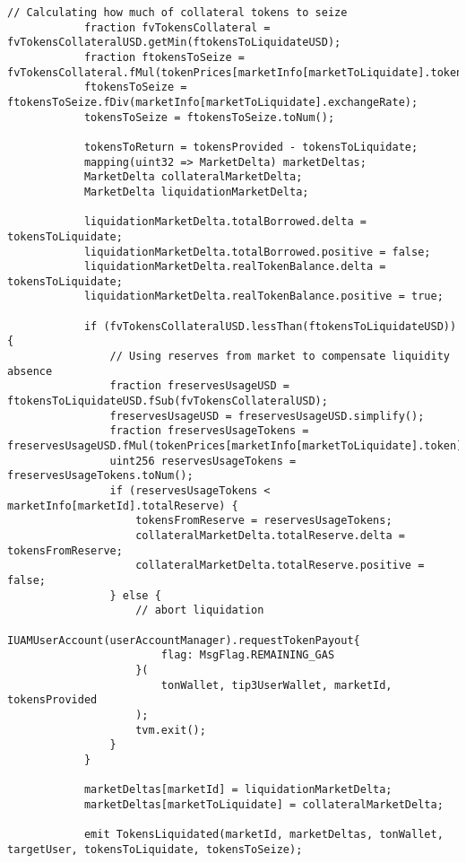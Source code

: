 \begin{lstlisting}[firstnumber=101]
            // Calculating how much of collateral tokens to seize
            fraction fvTokensCollateral = fvTokensCollateralUSD.getMin(ftokensToLiquidateUSD);
            fraction ftokensToSeize = fvTokensCollateral.fMul(tokenPrices[marketInfo[marketToLiquidate].token]);
            ftokensToSeize = ftokensToSeize.fDiv(marketInfo[marketToLiquidate].exchangeRate);
            tokensToSeize = ftokensToSeize.toNum();

            tokensToReturn = tokensProvided - tokensToLiquidate;
            mapping(uint32 => MarketDelta) marketDeltas;
            MarketDelta collateralMarketDelta;
            MarketDelta liquidationMarketDelta;

            liquidationMarketDelta.totalBorrowed.delta = tokensToLiquidate;
            liquidationMarketDelta.totalBorrowed.positive = false;
            liquidationMarketDelta.realTokenBalance.delta = tokensToLiquidate;
            liquidationMarketDelta.realTokenBalance.positive = true;

            if (fvTokensCollateralUSD.lessThan(ftokensToLiquidateUSD)) {
                // Using reserves from market to compensate liquidity absence
                fraction freservesUsageUSD = ftokensToLiquidateUSD.fSub(fvTokensCollateralUSD);
                freservesUsageUSD = freservesUsageUSD.simplify();
                fraction freservesUsageTokens = freservesUsageUSD.fMul(tokenPrices[marketInfo[marketToLiquidate].token]);
                uint256 reservesUsageTokens = freservesUsageTokens.toNum();
                if (reservesUsageTokens < marketInfo[marketId].totalReserve) {
                    tokensFromReserve = reservesUsageTokens;
                    collateralMarketDelta.totalReserve.delta = tokensFromReserve;
                    collateralMarketDelta.totalReserve.positive = false;
                } else {
                    // abort liquidation
                    IUAMUserAccount(userAccountManager).requestTokenPayout{
                        flag: MsgFlag.REMAINING_GAS
                    }(
                        tonWallet, tip3UserWallet, marketId, tokensProvided
                    );
                    tvm.exit();
                }
            }

            marketDeltas[marketId] = liquidationMarketDelta;
            marketDeltas[marketToLiquidate] = collateralMarketDelta;

            emit TokensLiquidated(marketId, marketDeltas, tonWallet, targetUser, tokensToLiquidate, tokensToSeize);


\end{lstlisting}
